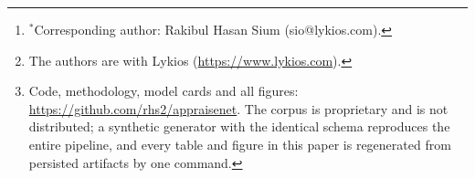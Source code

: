 \documentclass[journal,10pt]{IEEEtran}
\begin{document}
\title{\PaperTitle}

\author{Rakibul~Hasan~Sium$^{*}$ and Drew~Finstuen\\
\normalsize Lykios\\
\normalsize sio@lykios.com \quad drew@lykios.com%
\thanks{$^{*}$Corresponding author: Rakibul Hasan Sium (sio@lykios.com).}%
\thanks{The authors are with Lykios (\url{https://www.lykios.com}).}%
\thanks{Code, methodology, model cards and all figures: \url{https://github.com/rhs2/appraisenet}. The corpus is proprietary and is not distributed; a synthetic generator with the identical schema reproduces the entire pipeline, and every table and figure in this paper is regenerated from persisted artifacts by one command.}}


\maketitle
\end{document}
